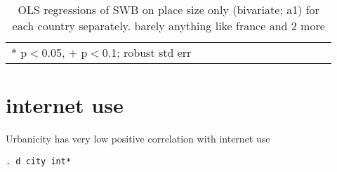 \documentclass[10pt, letterpaper]{article}
\begin{document}
\begin{spacing}{1.4}
\begin{spacing}{.9} \begin{table}[H]\centering   \begin{scriptsize} \begin{tabular}{p{.5in}p{.5in}p{.5in}p{.5in}p{.5in}p{.5in}p{.5in}p{.5in}p{.5in}p{.5in}p{.5
                                                                      in}p{.5in}p{.5
                                                                      in}}\hline
                                                                      
                                                                      \hline *
                                                                      p$<$0.05,
                                                                      $+$
                                                                      p$<$0.1;
                                                                      robust std
                                                                      err \end{tabular}\end{scriptsize}\caption{\label{d1}OLS
                                                                    regressions
                                                                    of SWB on
                                                                    place size
                                                                    only
                                                                    (bivariate; a1)
                                                                    for each
                                                                    country
                                                                    separately. barely
                                                                    anything
                                                                    like france
                                                                    and 2 more
                                                                  }\end{table} \end{spacing}


\section{internet use}

Urbanicity has very low positive correlation with internet use

\begin{spacing}{.5}
\begin{scriptsize}
\begin{verbatim}
. d city int*


\end{verbatim}
\end{scriptsize}
\end{spacing}
\end{spacing}
\end{document}
